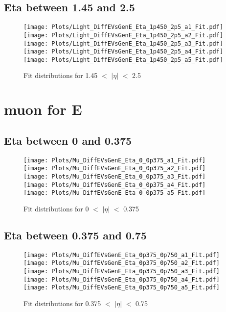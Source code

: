 \documentclass[a4paper,10pt]{article}
\begin{document}
 \subsection{Eta between 1.45 and 2.5}
 \begin{figure}[h!b] 
  \texttt{[image: Plots/Light\_DiffEVsGenE\_Eta\_1p450\_2p5\_a1\_Fit.pdf]} 
  \texttt{[image: Plots/Light\_DiffEVsGenE\_Eta\_1p450\_2p5\_a2\_Fit.pdf]} \\ 
  \texttt{[image: Plots/Light\_DiffEVsGenE\_Eta\_1p450\_2p5\_a3\_Fit.pdf]} 
  \texttt{[image: Plots/Light\_DiffEVsGenE\_Eta\_1p450\_2p5\_a4\_Fit.pdf]} \\ 
  \texttt{[image: Plots/Light\_DiffEVsGenE\_Eta\_1p450\_2p5\_a5\_Fit.pdf]} 
 \caption{Fit distributions for 1.45 $<$ $\vert \eta \vert$ $<$ 2.5}
\end{figure} 

\newpage 
\section{muon for E}
 \subsection{Eta between 0 and 0.375}
 \begin{figure}[h!b] 
  \texttt{[image: Plots/Mu\_DiffEVsGenE\_Eta\_0\_0p375\_a1\_Fit.pdf]} 
  \texttt{[image: Plots/Mu\_DiffEVsGenE\_Eta\_0\_0p375\_a2\_Fit.pdf]} \\ 
  \texttt{[image: Plots/Mu\_DiffEVsGenE\_Eta\_0\_0p375\_a3\_Fit.pdf]} 
  \texttt{[image: Plots/Mu\_DiffEVsGenE\_Eta\_0\_0p375\_a4\_Fit.pdf]} \\ 
  \texttt{[image: Plots/Mu\_DiffEVsGenE\_Eta\_0\_0p375\_a5\_Fit.pdf]} 
 \caption{Fit distributions for 0 $<$ $\vert \eta \vert$ $<$ 0.375}
 \end{figure}
 \newpage 
 \subsection{Eta between 0.375 and 0.75}
 \begin{figure}[h!b] 
  \texttt{[image: Plots/Mu\_DiffEVsGenE\_Eta\_0p375\_0p750\_a1\_Fit.pdf]} 
  \texttt{[image: Plots/Mu\_DiffEVsGenE\_Eta\_0p375\_0p750\_a2\_Fit.pdf]} \\ 
  \texttt{[image: Plots/Mu\_DiffEVsGenE\_Eta\_0p375\_0p750\_a3\_Fit.pdf]} 
  \texttt{[image: Plots/Mu\_DiffEVsGenE\_Eta\_0p375\_0p750\_a4\_Fit.pdf]} \\ 
  \texttt{[image: Plots/Mu\_DiffEVsGenE\_Eta\_0p375\_0p750\_a5\_Fit.pdf]} 
 \caption{Fit distributions for 0.375 $<$ $\vert \eta \vert$ $<$ 0.75}
 \end{figure}
 \newpage 
\end{document}
